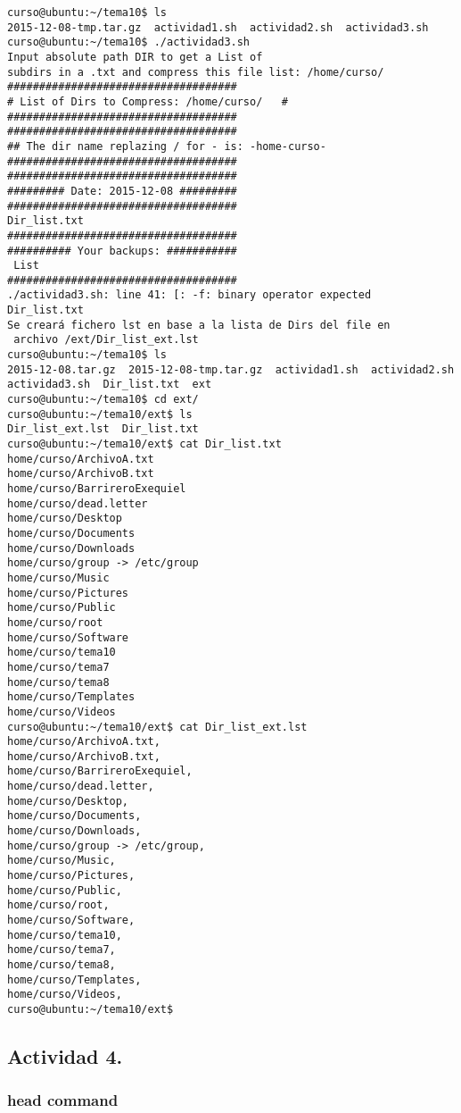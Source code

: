 \documentclass[a4paper,11pt,spanish]{article} %
\newenvironment{myscriptlisting}
{\begin{list}{}{\setlength{\leftmargin}{1em}}\item\scriptsize\bfseries}
{\end{list}}
\begin{document}
\begin{myscriptlisting}
 \begin{verbatim}
curso@ubuntu:~/tema10$ ls
2015-12-08-tmp.tar.gz  actividad1.sh  actividad2.sh  actividad3.sh
curso@ubuntu:~/tema10$ ./actividad3.sh 
Input absolute path DIR to get a List of
subdirs in a .txt and compress this file list: /home/curso/
####################################
# List of Dirs to Compress: /home/curso/   #
####################################
####################################
## The dir name replazing / for - is: -home-curso-       
####################################
####################################
######### Date: 2015-12-08 #########
####################################
Dir_list.txt
####################################
########## Your backups: ###########
 List                        
####################################
./actividad3.sh: line 41: [: -f: binary operator expected
Dir_list.txt
Se creará fichero lst en base a la lista de Dirs del file en 
 archivo /ext/Dir_list_ext.lst
curso@ubuntu:~/tema10$ ls
2015-12-08.tar.gz  2015-12-08-tmp.tar.gz  actividad1.sh  actividad2.sh  actividad3.sh  Dir_list.txt  ext
curso@ubuntu:~/tema10$ cd ext/
curso@ubuntu:~/tema10/ext$ ls
Dir_list_ext.lst  Dir_list.txt
curso@ubuntu:~/tema10/ext$ cat Dir_list.txt 
home/curso/ArchivoA.txt
home/curso/ArchivoB.txt
home/curso/BarrireroExequiel
home/curso/dead.letter
home/curso/Desktop
home/curso/Documents
home/curso/Downloads
home/curso/group -> /etc/group
home/curso/Music
home/curso/Pictures
home/curso/Public
home/curso/root
home/curso/Software
home/curso/tema10
home/curso/tema7
home/curso/tema8
home/curso/Templates
home/curso/Videos
curso@ubuntu:~/tema10/ext$ cat Dir_list_ext.lst 
home/curso/ArchivoA.txt,
home/curso/ArchivoB.txt,
home/curso/BarrireroExequiel,
home/curso/dead.letter,
home/curso/Desktop,
home/curso/Documents,
home/curso/Downloads,
home/curso/group -> /etc/group,
home/curso/Music,
home/curso/Pictures,
home/curso/Public,
home/curso/root,
home/curso/Software,
home/curso/tema10,
home/curso/tema7,
home/curso/tema8,
home/curso/Templates,
home/curso/Videos,
curso@ubuntu:~/tema10/ext$ 
 \end{verbatim}
\end{myscriptlisting}

\subsection{Actividad 4.}

\subsubsection{head command}
\end{document}
